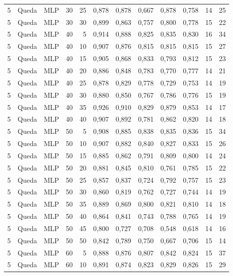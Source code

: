 \begin{longtable}{ccclrrrrrrrr}
5 & Queda & MLP & 30 & 25 & 0,878 & 0,878 & 0,667 & 0,878 & 0,758 & 14 & 25 \\
5 & Queda & MLP & 30 & 30 & 0,899 & 0,863 & 0,757 & 0,800 & 0,778 & 15 & 22 \\
5 & Queda & MLP & 40 & 5 & 0,914 & 0,888 & 0,825 & 0,835 & 0,830 & 16 & 34 \\
5 & Queda & MLP & 40 & 10 & 0,907 & 0,876 & 0,815 & 0,815 & 0,815 & 15 & 27 \\
5 & Queda & MLP & 40 & 15 & 0,905 & 0,868 & 0,833 & 0,793 & 0,812 & 15 & 23 \\
5 & Queda & MLP & 40 & 20 & 0,886 & 0,848 & 0,783 & 0,770 & 0,777 & 14 & 21 \\
5 & Queda & MLP & 40 & 25 & 0,878 & 0,829 & 0,778 & 0,729 & 0,753 & 14 & 19 \\
5 & Queda & MLP & 40 & 30 & 0,880 & 0,850 & 0,767 & 0,786 & 0,776 & 15 & 19 \\
5 & Queda & MLP & 40 & 35 & 0,926 & 0,910 & 0,829 & 0,879 & 0,853 & 14 & 17 \\
5 & Queda & MLP & 40 & 40 & 0,907 & 0,892 & 0,781 & 0,862 & 0,820 & 14 & 18 \\
5 & Queda & MLP & 50 & 5 & 0,908 & 0,885 & 0,838 & 0,835 & 0,836 & 15 & 34 \\
5 & Queda & MLP & 50 & 10 & 0,907 & 0,882 & 0,840 & 0,827 & 0,833 & 15 & 26 \\
5 & Queda & MLP & 50 & 15 & 0,885 & 0,862 & 0,791 & 0,809 & 0,800 & 14 & 24 \\
5 & Queda & MLP & 50 & 20 & 0,881 & 0,845 & 0,810 & 0,761 & 0,785 & 15 & 22 \\
5 & Queda & MLP & 50 & 25 & 0,857 & 0,837 & 0,724 & 0,792 & 0,757 & 15 & 23 \\
5 & Queda & MLP & 50 & 30 & 0,860 & 0,819 & 0,762 & 0,727 & 0,744 & 14 & 19 \\
5 & Queda & MLP & 50 & 35 & 0,889 & 0,869 & 0,800 & 0,821 & 0,810 & 14 & 18 \\
5 & Queda & MLP & 50 & 40 & 0,864 & 0,841 & 0,743 & 0,788 & 0,765 & 14 & 19 \\
5 & Queda & MLP & 50 & 45 & 0,800 & 0,727 & 0,708 & 0,548 & 0,618 & 14 & 16 \\
5 & Queda & MLP & 50 & 50 & 0,842 & 0,789 & 0,750 & 0,667 & 0,706 & 15 & 14 \\
5 & Queda & MLP & 60 & 5 & 0,888 & 0,876 & 0,807 & 0,842 & 0,824 & 15 & 37 \\
5 & Queda & MLP & 60 & 10 & 0,891 & 0,874 & 0,823 & 0,829 & 0,826 & 15 & 29 \\

\end{longtable}
